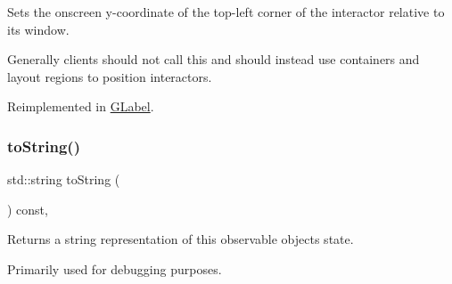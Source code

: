 Sets the onscreen y-\/coordinate of the top-\/left corner of the interactor relative to its window. 

Generally clients should not call this and should instead use containers and layout regions to position interactors. 

Reimplemented in \mbox{\hyperlink{classsgl_1_1GLabel_a0b738606c7aca5c472b66c4e55b3c685}{G\+Label}}.

\mbox{\label{classsgl_1_1GObservable_a1fe5121d6528fdea3f243321b3fa3a49}} 
\subsubsection{\texorpdfstring{to\+String()}{toString()}}
{\footnotesize\ttfamily std\+::string to\+String (\begin{DoxyParamCaption}{ }\end{DoxyParamCaption}) const\hspace{0.3cm}{\ttfamily [virtual]}, {\ttfamily [inherited]}}



Returns a string representation of this observable object\textquotesingle{}s state. 

Primarily used for debugging purposes. 
